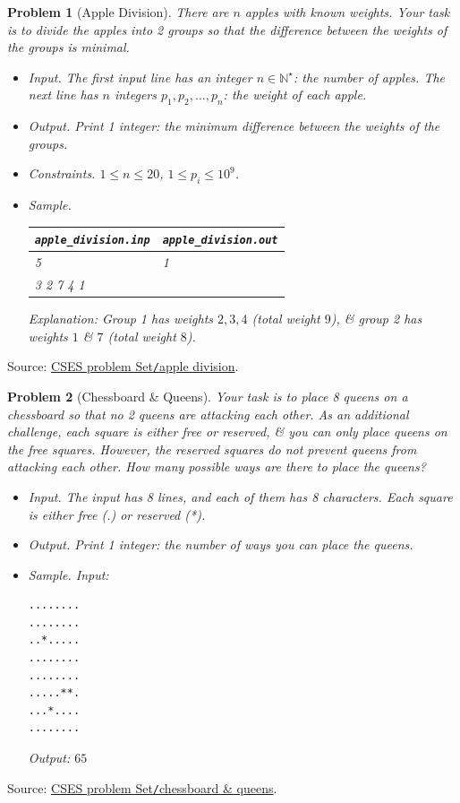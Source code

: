 \documentclass{article}
\newtheorem{problem}{Problem}
\begin{document}
\begin{problem}[Apple Division]
	There are $n$ apples with known weights. Your task is to divide the apples into 2 groups so that the difference between the weights of the groups is minimal.
	\begin{itemize}
		\item {\sf Input.} The first input line has an integer $n\in\mathbb{N}^\star$: the number of apples. The next line has $n$ integers $p_1,p_2,\ldots,p_n$: the weight of each apple.
		\item {\sf Output.} Print 1 integer: the minimum difference between the weights of the groups.
		\item {\sf Constraints.} $1\le n\le20$, $1\le p_i\le10^9$.
		\item {\sf Sample.}
		\begin{table}[H]
			\centering
			\begin{tabular}{|l|l|}
				\hline
				\verb|apple_division.inp| & \verb|apple_division.out| \\
				\hline
				5 & 1 \\
				3 2 7 4 1 &  \\
				\hline
			\end{tabular}
		\end{table}
		Explanation: Group 1 has weights $2,3,4$ (total weight $9$), \& group 2 has weights $1$ \& $7$ (total weight $8$).
	\end{itemize}
\end{problem}
Source: \href{https://cses.fi/problemset/task/1623}{CSES problem Set{\tt/}apple division}.

\begin{problem}[Chessboard \& Queens]
	Your task is to place 8 queens on a chessboard so that no 2 queens are attacking each other. As an additional challenge, each square is either free or reserved, \& you can only place queens on the free squares. However, the reserved squares do not prevent queens from attacking each other. How many possible ways are there to place the queens?	
	\begin{itemize}
		\item {\sf Input.} The input has 8 lines, and each of them has 8 characters. Each square is either free (.) or reserved (*).
		\item {\sf Output.} Print 1 integer: the number of ways you can place the queens.
		\item {\sf Sample.} Input:
\begin{verbatim}
........
........
..*.....
........
........
.....**.
...*....
........
\end{verbatim}
		Output: $65$
	\end{itemize}
\end{problem}
Source: \href{https://cses.fi/problemset/task/1624}{CSES problem Set{\tt/}chessboard \& queens}.
\end{document}
